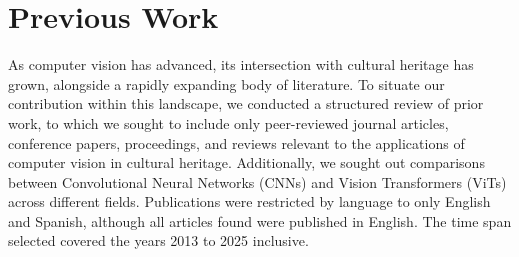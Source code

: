 \documentclass[conference]{IEEEtran}
\begin{document}

\section{Previous Work}
\label{sec:PreviousWork}

As computer vision has advanced, its intersection with cultural heritage has grown, alongside a rapidly expanding body of literature. To situate our contribution within this landscape, we conducted a structured review of prior work, to which we sought to include only peer-reviewed journal articles, conference papers, proceedings, and reviews relevant to the applications of computer vision in cultural heritage. Additionally, we sought out comparisons between Convolutional Neural Networks (CNNs) and Vision Transformers (ViTs) across different fields. Publications were restricted by language to only English and Spanish, although all articles found were published in English. The time span selected covered the years 2013 to 2025 inclusive. 
\end{document}
